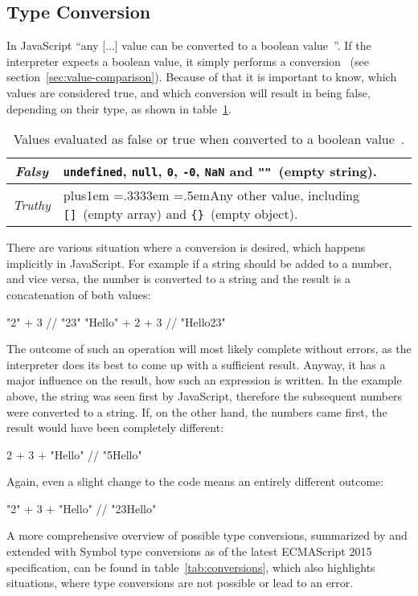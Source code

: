 \subsection{Type Conversion}
\label{sec:type-conversion}

In JavaScript ``any [...] value can be converted to a boolean value~\cite[p.~40]{JavaScriptTheDefinitiveGuide:Flanagan:2011}''. If the interpreter expects a boolean value, it simply performs a conversion~\cite[p.~46]{JavaScriptTheDefinitiveGuide:Flanagan:2011} (see section~\ref{sec:value-comparison}). Because of that it is important to know, which values are considered true, and which conversion will result in being false, depending on their type, as shown in table~\ref{tab:truthy-falsy}.
\begin{table}
\caption{Values evaluated as false or true when converted to a boolean value~\cite[p.~40]{JavaScriptTheDefinitiveGuide:Flanagan:2011}.}\label{tab:truthy-falsy}
\centering
  \def\rr{\rightskip=0pt plus1em \spaceskip=.3333em \xspaceskip=.5em\relax}
  \setlength{\tabcolsep}{1ex}
  \def\arraystretch{1.20}
  \setlength{\tabcolsep}{1ex}
  \small
  \begin{tabular}{|c||l|}
    \hline
    \emph{Falsy} & \texttt{undefined}, \texttt{null}, \texttt{0}, \texttt{-0}, \texttt{NaN} and \texttt{""}~(empty string). \\
    \hline
    \emph{Truthy} & {\rr Any other value, including \texttt{[]}~(empty array) and \texttt{\{\}}~(empty object). } \\
    \hline
  \end{tabular}
\end{table}
There are various situation where a conversion is desired, which happens implicitly in JavaScript. For example if a string should be added to a number, and vice versa, the number is converted to a string and the result is a concatenation of both values:
\begin{JsCode}[numbers=none]
"2" + 3 // "23"
"Hello" + 2 + 3 // "Hello23"
\end{JsCode}
The outcome of such an operation will most likely complete without errors, as the interpreter does its best to come up with a sufficient result. Anyway, it has a major influence on the result, how such an expression is written. In the example above, the string was seen first by JavaScript, therefore the subsequent numbers were converted to a string. If, on the other hand, the numbers came first, the result would have been completely different:
\begin{JsCode}[numbers=none]
2 + 3 + "Hello" // "5Hello"
\end{JsCode}
Again, even a slight change to the code means an entirely different outcome:
\begin{JsCode}[numbers=none]
"2" + 3 + "Hello" // "23Hello"
\end{JsCode}
A more comprehensive overview of possible type conversions, summarized by \citeauthor{JavaScriptTheDefinitiveGuide:Flanagan:2011} and extended with Symbol type conversions as of the latest ECMAScript 2015 specification, can be found in table~\ref{tab:conversions}, which also highlights situations, where type conversions are not possible or lead to an error.

